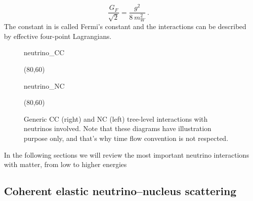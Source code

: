 \begin{equation}
	\label{eq:fermi_const}
	\frac{G_F}{\sqrt{2}} = \frac{g^2}{8\ m_W^2}\ .
\end{equation}
The constant in  is called Fermi's constant and the interactions %
can be described by effective four-point Lagrangians.
						    
\begin{figure}
	\centering
	\medskip
	\begin{fmffile}{neutrino_CC}
		\begin{fmfgraph*}(80,60)
		\end{fmfgraph*}
	\end{fmffile}
	\qquad
	\raisebox{2.5em}{,}
	\qquad
	\begin{fmffile}{neutrino_NC}
		\begin{fmfgraph*}(80,60)
		\end{fmfgraph*}
	\end{fmffile}
	\bigskip
	\caption{Generic CC (right) and NC (left) tree-level interactions with neutrinos involved.
		Note that these diagrams have illustration purpose only, and that's why time flow convention is not respected. }
	\label{fig:neutrino_tree}
\end{figure}

In the following sections we will review the most important neutrino interactions with matter, %
from low to higher energies

\subsection{Coherent elastic neutrino--nucleus scattering}

